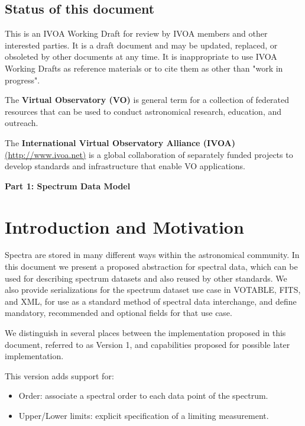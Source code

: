 \documentclass[11pt]{article}
\newcommand{\htzero}{}
\newcommand{\htpart}[1]{\centerline{\bf #1}}
\begin{document}
\clearpage

\subsection*{ Status of this document }

This is an IVOA Working Draft for review by IVOA members and other interested parties.
It is a draft document and may be updated, replaced, or obsoleted by other documents at any time.
It is inappropriate to use IVOA Working Drafts as reference materials or to cite them as other than "work in progress".

The {\bf Virtual Observatory (VO)} is general term for a collection of
federated resources that can be used to conduct astronomical research,
education, and outreach. 

The {\bf International Virtual Observatory Alliance
(IVOA)} \url{(http://www.ivoa.net)} is a global collaboration of separately
funded projects to develop standards and infrastructure that enable VO
applications.

\clearpage

\tableofcontents

\newpage


\htzero

{\Large
\vfill
\htpart{Part 1: Spectrum Data Model}
\vfill
}
\newpage
\section{Introduction and Motivation}

Spectra are stored in many different ways within the astronomical
community. In this document we present a proposed abstraction for
spectral data, which can be used for describing spectrum datasets and
also reused by other standards. We also provide serializations for the
spectrum dataset use case in VOTABLE, FITS, and XML, for use as a
standard method of spectral data interchange, and define mandatory,
recommended and optional fields for that use case.

We distinguish in several places between the implementation proposed in
this document, referred to as Version 1, and capabilities proposed for
possible later implementation.

This version adds support for:
\begin{itemize}
  \item Order: associate a spectral order to each data point of the spectrum.
  \item Upper/Lower limits: explicit specification of a limiting measurement.
\end{itemize}
\end{document}
